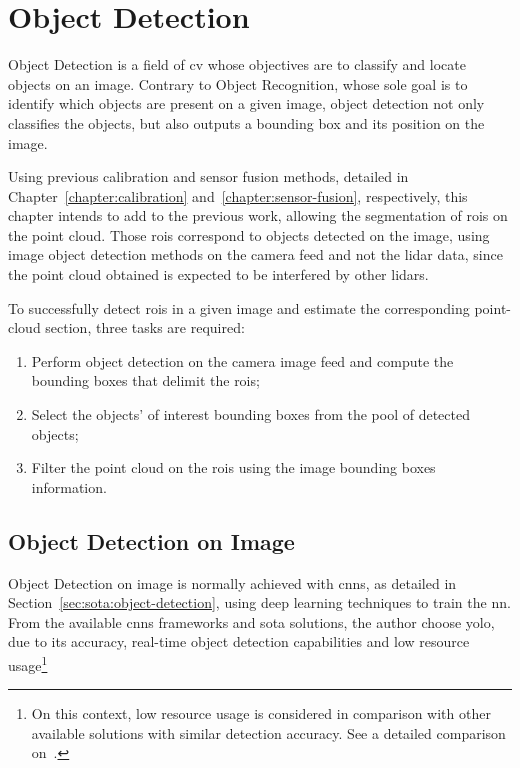 \chapter{Object Detection}
\label{chapter:object-detection}

Object Detection is a field of \acf{cv} whose objectives are to classify and locate objects on an image. Contrary to Object Recognition, whose sole goal is to identify which objects are present on a given image, object detection not only classifies the objects, but also outputs a bounding box and its position on the image. 

Using previous calibration and sensor fusion methods, detailed in Chapter~\ref{chapter:calibration} and~\ref{chapter:sensor-fusion}, respectively, this chapter intends to add to the previous work, allowing the segmentation of \acfp{roi} on the point cloud. Those \acp{roi} correspond to objects detected on the image, using image object detection methods on the camera feed and not the \ac{lidar} data, since the point cloud obtained is expected to be interfered by other \acp{lidar}.

To successfully detect \acp{roi} in a given image and estimate the corresponding point-cloud section, three tasks are required: 
\begin{enumerate}
	\item Perform object detection on the camera image feed and compute the bounding boxes that delimit the \acp{roi};
	\item Select the objects' of interest bounding boxes from the pool of detected objects;
	\item Filter the point cloud on the \acp{roi} using the image bounding boxes information.
\end{enumerate}

\section{Object Detection on Image}
\label{sec:object-detection:image}

Object Detection on image is normally achieved with \acfp{cnn}, as detailed in Section~\ref{sec:sota:object-detection}, using deep learning techniques to train the \acl{nn}. From the available \acp{cnn} frameworks and \acl{sota} solutions, the author choose \ac{yolo}, due to its accuracy, real-time object detection capabilities and low resource usage\footnote{On this context, low resource usage is considered in comparison with other available solutions with similar detection accuracy. See a detailed comparison on~\cite{Redmon2018}.}~\cite{Redmon2016, Redmon2017}

